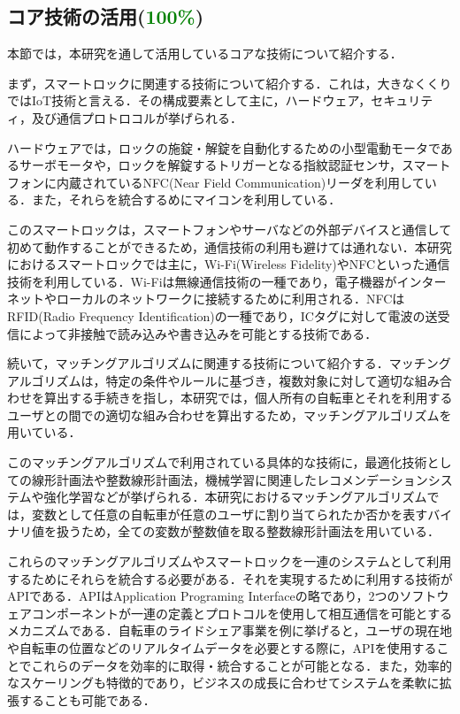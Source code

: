   \subsection{コア技術の活用(\textcolor{green}{100\%})}
    \label{sec:コア技術の活用}
      \par 本節では，本研究を通して活用しているコアな技術について紹介する．
      \par まず，スマートロックに関連する技術について紹介する．これは，大きなくくりではIoT技術と言える．その構成要素として主に，ハードウェア，セキュリティ，及び通信プロトロコルが挙げられる．
      \par ハードウェアでは，ロックの施錠・解錠を自動化するための小型電動モータであるサーボモータや，ロックを解錠するトリガーとなる指紋認証センサ，スマートフォンに内蔵されているNFC(Near Field Communication)リーダを利用している．また，それらを統合するめにマイコンを利用している．
      \par このスマートロックは，スマートフォンやサーバなどの外部デバイスと通信して初めて動作することができるため，通信技術の利用も避けては通れない．本研究におけるスマートロックでは主に，Wi-Fi(Wireless Fidelity)やNFCといった通信技術を利用している．Wi-Fiは無線通信技術の一種であり，電子機器がインターネットやローカルのネットワークに接続するために利用される．NFCはRFID(Radio Frequency Identification)の一種であり，ICタグに対して電波の送受信によって非接触で読み込みや書き込みを可能とする技術である．
      \par 続いて，マッチングアルゴリズムに関連する技術について紹介する．マッチングアルゴリズムは，特定の条件やルールに基づき，複数対象に対して適切な組み合わせを算出する手続きを指し，本研究では，個人所有の自転車とそれを利用するユーザとの間での適切な組み合わせを算出するため，マッチングアルゴリズムを用いている．
      \par このマッチングアルゴリズムで利用されている具体的な技術に，最適化技術としての線形計画法や整数線形計画法，機械学習に関連したレコメンデーションシステムや強化学習などが挙げられる．本研究におけるマッチングアルゴリズムでは，変数として任意の自転車が任意のユーザに割り当てられたか否かを表すバイナリ値を扱うため，全ての変数が整数値を取る整数線形計画法を用いている．
      \par これらのマッチングアルゴリズムやスマートロックを一連のシステムとして利用するためにそれらを統合する必要がある．それを実現するために利用する技術がAPIである．APIはApplication Programing Interfaceの略であり，2つのソフトウェアコンポーネントが一連の定義とプロトコルを使用して相互通信を可能とするメカニズムである．自転車のライドシェア事業を例に挙げると，ユーザの現在地や自転車の位置などのリアルタイムデータを必要とする際に，APIを使用することでこれらのデータを効率的に取得・統合することが可能となる．また，効率的なスケーリングも特徴的であり，ビジネスの成長に合わせてシステムを柔軟に拡張することも可能である．

